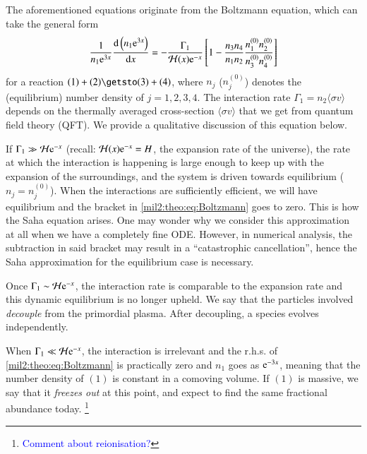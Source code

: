 The aforementioned equations originate from the Boltzmann equation, which can take the general form
\begin{equation}\label{mil2:theo:eq:Boltzmann}
    \frac{1}{n_1 \eu^{3x}} \dv{\left(n_1\eu^{3x}\right)}{x} = - \frac{\Gamma_1}{\Hp(x)\eu^{-x}} \left[1- \frac{n_3 n_4}{n_1 n_2} \frac{n_1^{(0)} n_2^{(0)}}{n_3^{(0)} n_4^{(0)}}  \right]
\end{equation}
for a reaction $(1) + (2) \getsto (3) + (4)$, where $n_j$ ($n_j^{(0)}$) denotes the (equilibrium) number density of $j=1,2,3,4$. The interaction rate $\Gamma_1 = n_2 \langle\sigma v\rangle$ depends on the thermally averaged cross-section $\langle\sigma v\rangle$ that we get from quantum field theory (QFT). We provide a qualitative discussion of this equation below.

If $\Gamma_1 \gg \Hp\eu^{-x}$ (recall: $\Hp(x)\eu^{-x}= H$, the expansion rate of the universe), the rate at which the interaction is happening is large enough to keep up with the expansion of the surroundings, and the system is driven towards equilibrium ($n_j = n_j^{(0)}$). When the interactions are sufficiently efficient, we will have equilibrium and the bracket in \cref{mil2:theo:eq:Boltzmann} goes to zero. This is how the Saha equation arises. One may wonder why we consider this approximation at all when we have a completely fine ODE. However, in numerical analysis, the subtraction in said bracket may result in a ``catastrophic cancellation'', hence the Saha approximation for the equilibrium case is necessary.

Once $\Gamma_1 \sim \Hp\eu^{-x}$, the interaction rate is comparable to the expansion rate and this dynamic equilibrium is no longer upheld. We say that the particles involved \textit{decouple} from the primordial plasma. After decoupling, a species evolves independently.

When $\Gamma_1 \ll \Hp\eu^{-x}$, the interaction is irrelevant and the r.h.s. of \cref{mil2:theo:eq:Boltzmann} is practically zero and $n_1$ goes as $\eu^{-3x}$, meaning that the number density of $(1)$ is constant in a comoving volume. If $(1)$ is massive, we say that it \textit{freezes out} at this point, and expect to find the same fractional abundance today. \footnote{\textcolor{blue}{Comment about reionisation?}}



